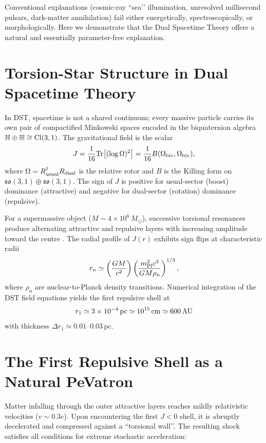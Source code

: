 \documentclass[dvipdfmx,11pt,a4paper]{article}
\begin{document}
Conventional explanations (cosmic-ray ``sea’’ illumination, unresolved millisecond pulsars, dark-matter annihilation) fail either energetically, spectroscopically, or morphologically. Here we demonstrate that the Dual Spacetime Theory \cite{DST2025} offers a natural and essentially parameter-free explanation.

\section{Torsion-Star Structure in Dual Spacetime Theory}

In DST, spacetime is not a shared continuum; every massive particle carries its own pair of compactified Minkowski spaces encoded in the biquaternion algebra $\mathbb{H}\oplus\mathbb{H}\cong{\rm Cl}(3,1)$. The gravitational field is the scalar
\[
J = \frac{1}{16}{\rm Tr}\!\left[(\log\Omega)^2\right] = \frac{1}{16}B(\Omega_{\rm biv},\Omega_{\rm biv}),
\]
where $\Omega = R_{\rm usual}^\dagger R_{\rm dual}$ is the relative rotor and $B$ is the Killing form on $\mathfrak{so}(3,1)\oplus\mathfrak{so}(3,1)$. The sign of $J$ is positive for usual-sector (boost) dominance (attractive) and negative for dual-sector (rotation) dominance (repulsive).

For a supermassive object ($M\sim 4\times10^6\,M_\odot$), successive torsional resonances produce alternating attractive and repulsive layers with increasing amplitude toward the centre \cite{DST2025}. The radial profile of $J(r)$ exhibits sign flips at characteristic radii
\[
r_n \simeq \left(\frac{GM}{c^2}\right) \left(\frac{m_{\rm Pl}^2 c^2}{GM\rho_n}\right)^{1/3},
\]
where $\rho_n$ are nuclear-to-Planck density transitions. Numerical integration of the DST field equations yields the first repulsive shell at
\[
r_1 \simeq 3\times10^{-4}\,{\rm pc} \simeq 10^{15}\,{\rm cm} \simeq 600\,{\rm AU}
\]
with thickness $\Delta r_1 \simeq 0.01$--$0.03\,$pc.

\section{The First Repulsive Shell as a Natural PeVatron}

Matter infalling through the outer attractive layers reaches mildly relativistic velocities ($v\sim 0.3c$). Upon encountering the first $J<0$ shell, it is abruptly decelerated and compressed against a ``torsional wall’’. The resulting shock satisfies all conditions for extreme stochastic acceleration:
\end{document}

